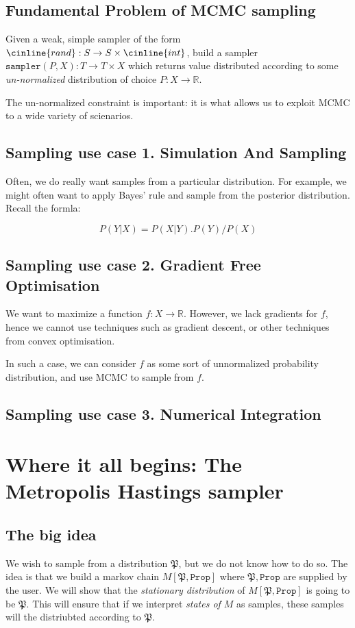 \documentclass[titlepage]{article}
\newcommand{\R}{\mathbb{R}}
\renewcommand{\P}{\mathfrak{P}}
\newcommand{\Prop}{\texttt{Prop}}
\begin{document}
\subsection{Fundamental Problem of MCMC sampling}
Given a weak, simple sampler of the form $\cinline{rand} : S \rightarrow S \times \cinline{int}$,
build a sampler $\texttt{sampler}(P, X): T \rightarrow T \times X$ which returns
value distributed according to some \emph{un-normalized}
distribution of choice $P: X \rightarrow \mathbb R$.

The un-normalized constraint is important: it is what allows
us to exploit MCMC to a wide variety of scienarios.

\subsection{Sampling use case 1. Simulation And Sampling}
Often, we do really want samples from a particular distribution. For example,
we might often want to apply Bayes' rule and sample from the posterior
distribution. Recall the formla:

$$
P(Y|X) = P(X|Y).P(Y)/P(X)
$$


\subsection{Sampling use case 2. Gradient Free Optimisation}
We  want to maximize a function $f: X \rightarrow \R$. However, we lack
gradients for $f$, hence we cannot use techniques such as gradient
descent, or other techniques from convex optimisation.

In such a case, we can consider $f$ as some sort of unnormalized
probability distribution, and use MCMC to sample from $f$.


\subsection{Sampling use case 3. Numerical Integration}

\section{Where it all begins: The Metropolis Hastings sampler}
\subsection{The big idea}
We wish to sample from a distribution $\P$, but we do not know how to do so.
The idea is that we build a markov chain $M[\P, \Prop]$ where $\P, \Prop$ are
supplied by the user. We will show that the \emph{stationary distribution} of $M[\P, \Prop]$
is going to be $\P$. This will ensure that if we interpret \emph{states of $M$} as samples,
these samples will the distriubted according to $\P$.
\end{document}
